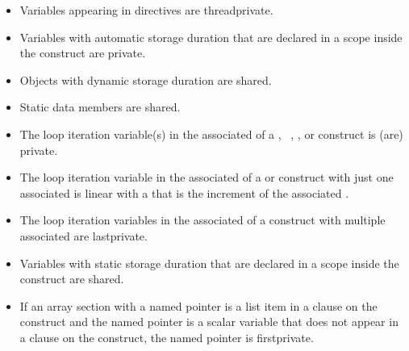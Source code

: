 \begin{ccppspecific}
\begin{itemize}
\item Variables appearing in  directives are threadprivate.

\item Variables with automatic storage duration that are declared in a scope inside the
construct are private.

\item Objects with dynamic storage duration are shared.

\item Static data members are shared.

\item The loop iteration variable(s) in the associated  of a
  , ~, , or  construct is (are) private.

\item The loop iteration variable in the associated  of a
   or   construct with just
one associated  is linear with a  that is the increment of
the associated .

\item The loop iteration variables in the associated  of a  construct with
multiple associated  are lastprivate.

\item Variables with static storage duration that are declared in a scope inside the construct
are shared.

\item If an array section with a named pointer is a list item in a
 clause on the  construct and the named pointer is a
scalar variable that does not appear in a  clause on the construct,
the named pointer is firstprivate.

\end{itemize}
\end{ccppspecific}
%
